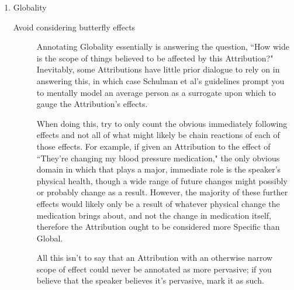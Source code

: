 \documentclass[a4paper,12pt]{article}
\begin{document}
\begin{enumerate}
    \item Globality
        \begin{description}
            \item[Avoid considering butterfly effects] Annotating Globality essentially is answering the question, ``How wide is the scope of things believed to be affected by this Attribution?" Inevitably, some Attributions have little prior dialogue to rely on in answering this, in which case Schulman et al's guidelines prompt you to mentally model an average person as a surrogate upon which to gauge the Attribution's effects.

                When doing this, try to only count the obvious immediately following effects and not all of what might likely be chain reactions of each of those effects. For example, if given an Attribution to the effect of ``They're changing my blood pressure medication," the only obvious domain in which that plays a major, immediate role is the speaker's physical health, though a wide range of future changes might possibly or probably change as a result. However, the majority of these further effects would likely only be a result of whatever physical change the medication brings about, and not the change in medication itself, therefore the Attribution ought to be considered more Specific than Global.

                All this isn't to say that an Attribution with an otherwise narrow scope of effect could never be annotated as more pervasive; if you believe that the speaker believes it's pervasive, mark it as such.
        \end{description}
    \end{enumerate}
\end{document}
